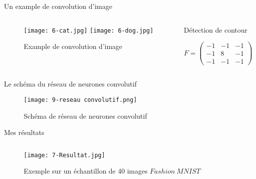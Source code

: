 \begin{frame}{Un example de convolution d'image}
    \begin{columns}[T] %
        \begin{column}{.6\textwidth}
            \begin{figure}
                \texttt{[image: 6-cat.jpg]}
                \texttt{[image: 6-dog.jpg]}
                \caption[]{Example de convolution d'image}
            \end{figure}
        \end{column}
        \begin{column}{0.35\textwidth}
            \begin{exampleblock}{Détection de contour}
                \begin{center}
                    \centering
                    $
                        F =
                        \begin{pmatrix}
                            -1 & -1 & -1 \\
                            -1 & 8  & -1 \\
                            -1 & -1 & -1
                        \end{pmatrix}
                    $
                \end{center}
            \end{exampleblock}
        \end{column}
    \end{columns}
\end{frame}


\begin{frame}{Le schéma du réseau de neurones convolutif}
    \begin{figure}
        \texttt{[image: 9-reseau convolutif.png]}
        \caption[]{Schéma de réseau de neurones convolutif}
    \end{figure}
\end{frame}

\begin{frame}{Mes résultats}
    \begin{columns}[T]
        \begin{column}{.68\textwidth}
            \begin{figure}
                \centering
                \texttt{[image: 7-Resultat.jpg]}
                \caption{Exemple sur un échantillon de 40 images $Fashion\ MNIST$}
            \end{figure}
        \end{column}
        \hfill
        \begin{column}{.35\textwidth}
            \bigskip	\bigskip	\bigskip
            
        \end{column}
    \end{columns}
\end{frame}
